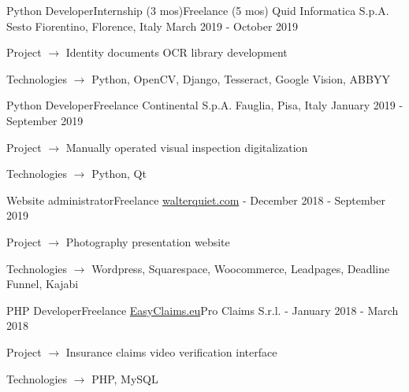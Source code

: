 
\begin{cventries}

  \cventry
    {Python Developer{\enskip\cdotp\enskip}Internship (3 mos){\enskip\cdotp\enskip}Freelance (5 mos)}
    {Quid Informatica S.p.A.}
    {Sesto Fiorentino, Florence, Italy}
    {March 2019 - October 2019}
    {
      \begin{cvitems}
        \item {Project $\rightarrow$ Identity documents OCR library development}
        \item {Technologies $\rightarrow$ Python, OpenCV, Django, Tesseract, Google Vision, ABBYY}
      \end{cvitems}
    }

  \cventry
    {Python Developer{\enskip\cdotp\enskip}Freelance}
    {Continental S.p.A.}
    {Fauglia, Pisa, Italy}
    {January 2019 - September 2019}
    {
      \begin{cvitems}
        \item {Project $\rightarrow$ Manually operated visual inspection digitalization}
        \item {Technologies $\rightarrow$ Python, Qt}
      \end{cvitems}
    }

  \cventry
    {Website administrator{\enskip\cdotp\enskip}Freelance}
    {\href{https://www.walterquiet.com}{walterquiet.com}}
    {-}
    {December 2018 - September 2019}
    {
      \begin{cvitems}
        \item {Project $\rightarrow$ Photography presentation website}
        \item {Technologies $\rightarrow$ Wordpress, Squarespace, Woocommerce, Leadpages, Deadline Funnel, Kajabi}
      \end{cvitems}
    }

  \cventry
    {PHP Developer{\enskip\cdotp\enskip}Freelance}
    {\href{https://www.easyclaims.eu}{EasyClaims.eu}{\enskip\cdotp\enskip}Pro Claims S.r.l.}
    {-}
    {January 2018 - March 2018}
    {
      \begin{cvitems}
        \item {Project $\rightarrow$ Insurance claims video verification interface}
        \item {Technologies $\rightarrow$ PHP, MySQL}
      \end{cvitems}
    }


\end{cventries}
